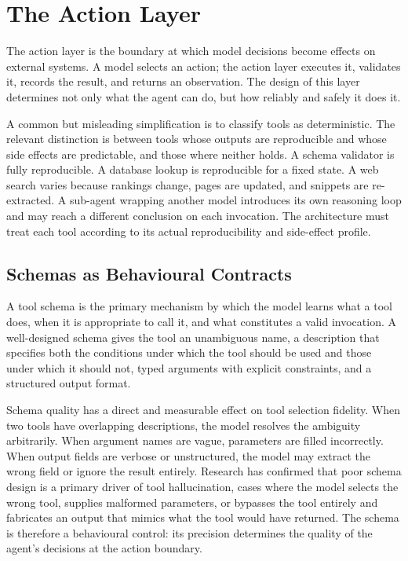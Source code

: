 \chapter{The Action Layer}

The action layer is the boundary at which model decisions become effects on external
systems. A model selects an action; the action layer executes it, validates it, records
the result, and returns an observation. The design of this layer determines not only what
the agent can do, but how reliably and safely it does it.

A common but misleading simplification is to classify tools as deterministic. The
relevant distinction is between tools whose outputs are reproducible and whose side
effects are predictable, and those where neither holds. A schema validator is fully
reproducible. A database lookup is reproducible for a fixed state. A web search varies
because rankings change, pages are updated, and snippets are re-extracted. A sub-agent
wrapping another model introduces its own reasoning loop and may reach a different
conclusion on each invocation. The architecture must treat each tool according to its
actual reproducibility and side-effect profile.

\section{Schemas as Behavioural Contracts}

A tool schema is the primary mechanism by which the model learns what a tool does, when
it is appropriate to call it, and what constitutes a valid invocation. A well-designed
schema gives the tool an unambiguous name, a description that specifies both the
conditions under which the tool should be used and those under which it should not, typed
arguments with explicit constraints, and a structured output format.

Schema quality has a direct and measurable effect on tool selection fidelity. When two
tools have overlapping descriptions, the model resolves the ambiguity arbitrarily. When
argument names are vague, parameters are filled incorrectly. When output fields are
verbose or unstructured, the model may extract the wrong field or ignore the result
entirely. Research has confirmed that poor schema design is a primary driver of tool
hallucination, cases where the model selects the wrong tool, supplies malformed
parameters, or bypasses the tool entirely and fabricates an output that mimics what the
tool would have returned. The schema is therefore a behavioural control: its precision
determines the quality of the agent's decisions at the action boundary.

